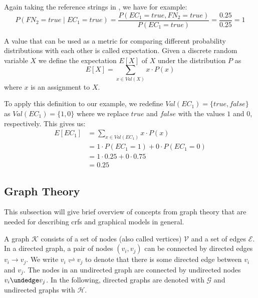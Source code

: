 Again taking the reference strings in , we have for example:
\begin{equation*}
    P(FN_2{=}true\mid EC_1{=}true)=\frac{P(EC_1{=}true, FN_2{=}true)}{P(EC_1{=}true)}=\frac{0.25}{0.25}=1
\end{equation*}

\bigskip

A value that can be used as a metric for comparing different \glspl{probability distribution} with each other is called \gls{expectation}.
Given a discrete \gls{random variable} $X$ we define the expectation $E[X]$ of $X$ under the distribution $P$ as~\cite{koller2009probabilistic}
\begin{equation}
  \label{equ:expectation-x}
  E[X]=\sum_{x\in Val(X)} x\cdot P(x)
\end{equation}
where $x$ is an \gls{assignment} to $X$.

To apply this definition to our example, we redefine $Val(EC_1)=\{true,false\}$ as $Val(EC_1)=\{1,0\}$ where we replace $true$ and $false$ with the values $1$ and $0$, respectively.
This gives us:
\begin{equation*}
  \begin{split}
  \label{equ:expectation-x}
  E[EC_1]&=\sum_{x\in Val(EC_1)} x\cdot P(x)\\
  &=1\cdot P(EC_1{=}1)+0\cdot P(EC_1{=}0)\\
  &=1\cdot 0.25+0\cdot 0.75\\
  &=0.25
  \end{split}
\end{equation*}



\subsection{Graph Theory}\label{subsec:graph-theory}

This subsection will give brief overview of concepts from graph theory that are needed for describing \glspl{crf} and graphical models in general.

\bigskip

A \gls{graph} $\mathcal{K}$ consists of a set of \glspl{node} (also called vertices) $\mathcal{V}$ and a set of \glspl{edge} $\mathcal{E}$.
In a directed \gls{graph}, a pair of \glspl{node} $(v_i,v_j)$ can be connected by directed \glspl{edge} $v_i\to v_j$.
We write $v_i\rightleftharpoons v_j$ to denote that there is some directed edge between $v_i$ and $v_j$.
The \glspl{node} in an undirected graph are connected by undirected \glspl{node} $v_i\undedge v_j$.
In the following, directed \glspl{graph} are denoted with $\mathcal{G}$ and undirected \glspl{graph} with $\mathcal{H}$.

